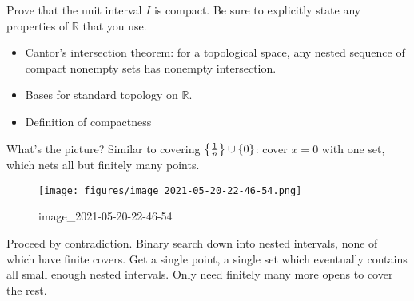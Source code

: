 \begin{problem}[Fall 2005]

Prove that the unit interval \(I\) is compact. Be sure to explicitly
state any properties of \({\mathbb{R}}\) that you use.

\end{problem}

\begin{concept}

\envlist

\begin{itemize}
\tightlist
\item
  Cantor's intersection theorem: for a topological space, any nested
  sequence of compact nonempty sets has nonempty intersection.
\item
  Bases for standard topology on \({\mathbb{R}}\).
\item
  Definition of compactness
\end{itemize}

\end{concept}

\begin{strategy}

What's the picture? Similar to covering
\(\left\{{1\over n}\right\}\cup\left\{{0}\right\}\): cover \(x=0\) with
one set, which nets all but finitely many points.

\begin{figure}
\centering
\texttt{[image: figures/image\_2021-05-20-22-46-54.png]}
\caption{image\_2021-05-20-22-46-54}
\end{figure}

Proceed by contradiction. Binary search down into nested intervals, none
of which have finite covers. Get a single point, a single set which
eventually contains all small enough nested intervals. Only need
finitely many more opens to cover the rest.

\end{strategy}

